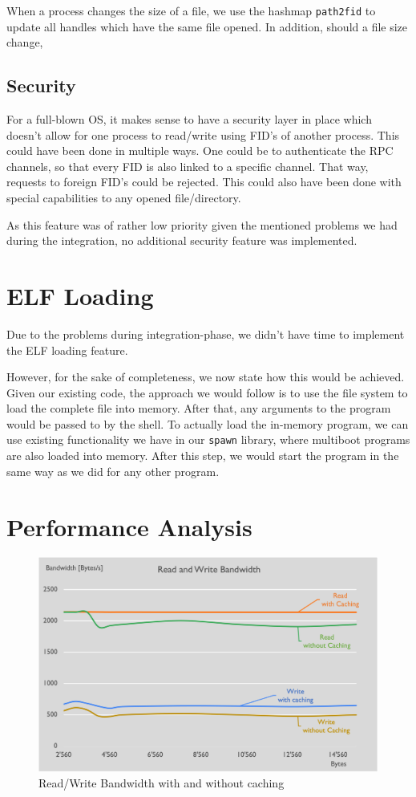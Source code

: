 When a process changes the size of a file, we use the hashmap \texttt{path2fid} to update all handles which have the same file opened.
In addition, should a file size change, 

\subsection{Security}
For a full-blown OS, it makes sense to have a security layer in place which 
doesn't allow for one process to read/write using FID's of another process.
This could have been done in multiple ways. One could be to authenticate the RPC channels,
so that every FID is also linked to a specific channel. That way, requests to foreign 
FID's could be rejected. This could also have been done with special capabilities to
any opened file/directory. 

As this feature was of rather low priority given the mentioned problems we had during the integration, no additional security feature was implemented.

\section{ELF Loading}
Due to the problems during integration-phase, we didn't have time to implement
the ELF loading feature.

However, for the sake of completeness, we now state how this would be achieved.
Given our existing code, the approach we would follow is to use 
the file system to load the complete file into memory. After that,
any arguments to the program would be passed to by the shell.
To actually load the in-memory program, we can use existing functionality 
we have in our \texttt{spawn} library, where multiboot programs 
are also loaded into memory. After this step, we would start the program 
in the same way as we did for any other program.

\section{Performance Analysis}

\begin{figure}[h]
\centering
\includegraphics[scale=0.55]{fs_rw_new.png}
\caption{Read/Write Bandwidth with and without caching}
\label{fig:fs_rw_bw}
\end{figure}

